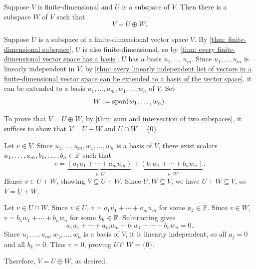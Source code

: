 \begin{thm} 
\label{thm:every-subspace-of-V-is-part-of-a-direct-sum-equal-to-V}
  Suppose $V$ is finite-dimensional and $U$ is a subspace of $V$. Then there is a subspace $W$ of $V$ such that
  \begin{equation}
    V = U \oplus W.
  \end{equation}
\end{thm}
\begin{prf}
  Suppose $U$ is a subspace of a finite-dimensional vector space $V$.
  By \ref{thm: finite-dimensional subspace}, $U$ is also finite-dimensional, so by \ref{thm: every finite-dimensional vector space has a basis}, $U$ has a basis $u_1, \ldots, u_m$.
  Since $u_1, \dots, u_m$ is linearly independent in $V$, by \ref{thm: every linearly independent list of vectors in a finite-dimensional vector space can be extended to a basis of the vector space}, it can be extended to a basis $u_1, \ldots, u_m, w_1, \ldots, w_n$ of $V$.
  Set
  \begin{equation}
    W := \operatorname{span} (w_1, \ldots, w_n).
  \end{equation}

  To prove that $V = U \oplus W$, by \ref{thm: sum and intersection of two subspaces}, it suffices to show that $V = U + W$ and $U \cap W = \{0\}$.
  \begin{description}
    \item{}
    Let $v \in V$. Since $u_1, \ldots, u_m, w_1, \ldots, w_n$ is a basis of $V$, there exist scalars $a_1, \dots, a_m, b_1, \dots, b_n \in \mathbb{F}$ such that
    \begin{equation}
      v = \underbrace{(a_1 u_1 + \cdots + a_m u_m)}_{\in \, U} + \underbrace{(b_1 w_1 + \cdots + b_n w_n)}_{\in \, W}.
    \end{equation}
    Hence $v \in U + W$, showing $V \subseteq U + W$. Since $U, W \subseteq V$, we have $U + W \subseteq V$, so $V = U + W$.

    \item{}
    Let $v \in U \cap W$. Since $v \in U$, $v = a_1 u_1 + \cdots + a_m u_m$ for some $a_j \in \mathbb{F}$. Since $v \in W$, $v = b_1 w_1 + \cdots + b_n w_n$ for some $b_k \in \mathbb{F}$.
    Subtracting gives
    \begin{equation}
      a_1 u_1 + \cdots + a_m u_m - b_1 w_1 - \cdots - b_n w_n = 0.
    \end{equation}
    Since $u_1, \dots, u_m, w_1, \dots, w_n$ is a basis of $V$, it is linearly independent, so all $a_j = 0$ and all $b_k = 0$. Thus $v = 0$, proving $U \cap W = \{0\}$.
  \end{description}
  Therefore, $V = U \oplus W$, as desired.
\end{prf}
